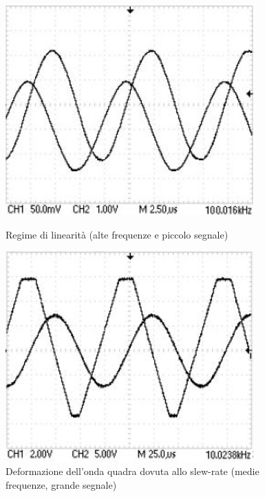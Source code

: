 \documentclass[10pt,a4paper]{article}
\begin{document}
\begin{figure}[H]
	\begin{minipage}{0.49\textwidth}
	\centering
	\includegraphics[width=0.85\textwidth]{../oscilloscopio/discriminatore_GBW.jpg}
	\caption{Regime di linearità (alte frequenze e piccolo segnale)}
	\label{fig:GBW}
	\end{minipage}
	\begin{minipage}{0.49\textwidth}
	\centering
	\includegraphics[width=0.85\textwidth]{../oscilloscopio/discriminator_slewrate.jpg}
	\caption{Deformazione dell'onda quadra dovuta allo slew-rate (medie frequenze, grande segnale)}
	\label{fig:slewrate_razzista}
	\end{minipage}
\end{figure}
\end{document}
